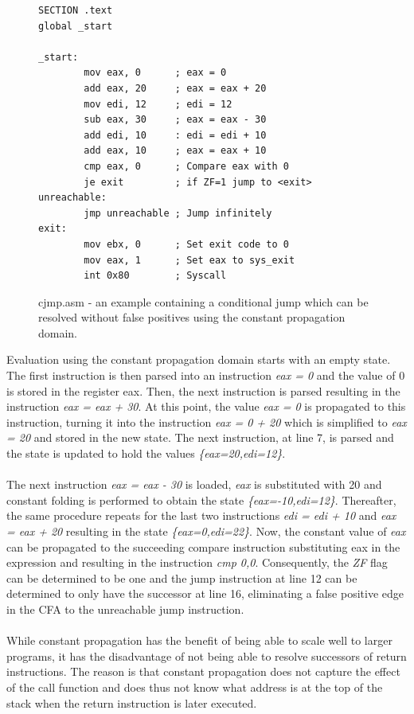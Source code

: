 \documentclass{kththesis}
\renewcommand{\it}[1]{\textit{#1}}
\begin{document}
\begin{figure}[!ht]
    \centering
\begin{tcolorbox}
\begin{verbatim}
SECTION .text
global _start

_start:
        mov eax, 0      ; eax = 0
        add eax, 20     ; eax = eax + 20
        mov edi, 12     ; edi = 12
        sub eax, 30     ; eax = eax - 30
        add edi, 10     : edi = edi + 10
        add eax, 10     ; eax = eax + 10
        cmp eax, 0      ; Compare eax with 0
        je exit         ; if ZF=1 jump to <exit>
unreachable:            
        jmp unreachable ; Jump infinitely
exit:
        mov ebx, 0      ; Set exit code to 0
        mov eax, 1      ; Set eax to sys_exit
        int 0x80        ; Syscall
\end{verbatim}
\end{tcolorbox}
\caption[]{cjmp.asm - an example containing a conditional jump which can be resolved without false positives using the constant propagation domain.}
    \label{fig:cjmp.asm}
\end{figure}
\noindent
Evaluation using the constant propagation domain starts with an empty state. The first instruction is then parsed into an instruction \it{eax = 0} and the value of 0 is stored in the register eax. Then, the next instruction is parsed resulting in the instruction \it{eax = eax + 30}. At this point, the value \it{eax = 0} is propagated to this instruction, turning it into the instruction \it{eax = 0 + 20} which is simplified to \it{eax = 20} and stored in the new state. The next instruction, at line 7, is parsed and the state is updated to hold the values \it{\{eax=20,edi=12\}}. 
\\ \\
The next instruction \it{eax = eax - 30} is loaded, \it{eax} is substituted with 20 and constant folding is performed to obtain the state \it{\{eax=-10,edi=12\}}. Thereafter, the same procedure repeats for the last two instructions \it{edi = edi + 10} and \it{eax = eax + 20} resulting in the state \it{\{eax=0,edi=22\}}. Now, the constant value of \it{eax} can be propagated to the succeeding compare instruction substituting eax in the expression and resulting in the instruction \it{cmp 0,0}. Consequently, the \it{ZF} flag can be determined to be one and the jump instruction at line 12 can be determined to only have the successor at line 16, eliminating a false positive edge in the CFA to the unreachable jump instruction.
\\ \\
While constant propagation has the benefit of being able to scale well to larger programs\cite{alternating}, it has the disadvantage of not being able to resolve successors of return instructions. The reason is that constant propagation does not capture the effect of the call function and does thus not know what address is at the top of the stack when the return instruction is later executed.
\end{document}
